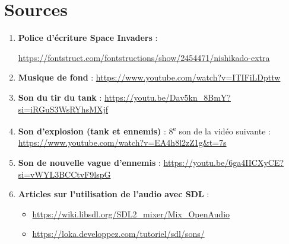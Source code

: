 \documentclass[12pt,a4paper]{report}
\begin{document}
\chapter{Sources}

\begin{enumerate}

    
  \item \textbf{Police d’écriture Space Invaders} :  

  
  \url{https://fontstruct.com/fontstructions/show/2454471/nishikado-extra}

  \item \textbf{Musique de fond} :  
  \url{https://www.youtube.com/watch?v=ITIFiLDpttw}

  \item \textbf{Son du tir du tank} :  
  \url{https://youtu.be/Dav5kn_8BmY?si=iRGuS3WsRYhsMXjf}

  \item \textbf{Son d’explosion (tank et ennemis)} :  
  8\textsuperscript{e} son de la vidéo suivante : 
  \\
  \url{https://www.youtube.com/watch?v=EA4h8l2zZ1g&t=7s}

  \item \textbf{Son de nouvelle vague d’ennemis} :  
  \url{https://youtu.be/6ga4IICXyCE?si=vWYL3BCCtvF9lspG}

  \item \textbf{Articles sur l’utilisation de l’audio avec SDL} :
  \begin{itemize}
    \item \url{https://wiki.libsdl.org/SDL2_mixer/Mix_OpenAudio}
    \item \url{https://loka.developpez.com/tutoriel/sdl/sons/}
  \end{itemize}
  \end{enumerate}
\end{document}
